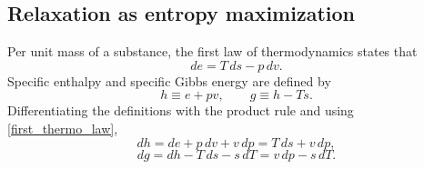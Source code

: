\subsection{Relaxation as entropy maximization}

Per unit mass of a substance, the first law of thermodynamics states that
\begin{equation}\label{first_thermo_law}
d e=T\, d s-p\,d v .
\end{equation}
Specific enthalpy and specific Gibbs energy are defined by
\begin{equation}\label{hg}
h\equiv e+pv,\qquad g\equiv h-Ts .
\end{equation}
Differentiating the definitions with the product rule and using \eqref{first_thermo_law},
\begin{equation}\label{dh}
d h=d e+p\,d v+v\,d p=T\,d s+v\,d p,
\end{equation}
\begin{equation}\label{dg}
d g=d h-T\,d s-s\,d T=v\,d p-s\,d T .
\end{equation}

